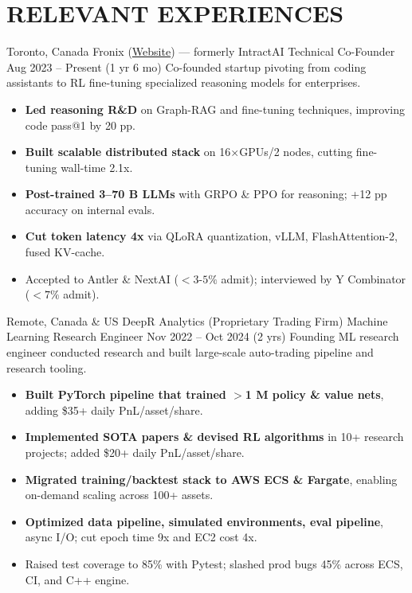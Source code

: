 \section{RELEVANT EXPERIENCES}

{\customcventry
    {Toronto, Canada}
    {Fronix (\href{https://fronix.net}{Website}) — formerly IntractAI}
    {Technical Co-Founder}
    {Aug 2023 – Present (1 yr 6 mo)}{}{}}
    Co-founded startup pivoting from coding assistants to RL fine-tuning specialized reasoning models for enterprises.
    \begin{itemize}
        \item \textbf{Led reasoning R\&D} on Graph-RAG and fine-tuning techniques, improving code pass@1 by 20 pp.
        \item \textbf{Built scalable distributed stack} on 16×GPUs/2 nodes, cutting fine-tuning wall-time 2.1x.
        \item \textbf{Post-trained 3–70 B LLMs} with GRPO \& PPO for reasoning; +12 pp accuracy on internal evals.
        \item \textbf{Cut token latency 4x} via QLoRA quantization, vLLM, FlashAttention-2, fused KV-cache.
        \item Accepted to Antler \& NextAI ($<$$3$-$5\%$ admit); interviewed by Y Combinator ($<$$7\%$ admit).
    \end{itemize}


{\customcventry
    {Remote, Canada \& US}
    {DeepR Analytics (Proprietary Trading Firm)}
    {Machine Learning Research Engineer}
    {Nov 2022 – Oct 2024 (2 yrs)}{}{}}
    Founding ML research engineer conducted research and built large-scale auto-trading pipeline and research tooling.
    \begin{itemize}
        \item \textbf{Built PyTorch pipeline that trained $>$1 M policy \& value nets}, adding \$35+ daily PnL/asset/share.
        \item \textbf{Implemented SOTA papers \& devised RL algorithms} in 10+ research projects; added \$20+ daily PnL/asset/share.
        \item \textbf{Migrated training/backtest stack to AWS ECS \& Fargate}, enabling on-demand scaling across 100+ assets.
        \item \textbf{Optimized data pipeline, simulated environments, eval pipeline}, async I/O; cut epoch time 9x and EC2 cost 4x.
        \item Raised test coverage to 85\% with Pytest; slashed prod bugs 45\% across ECS, CI, and C++ engine.
    \end{itemize}
  

